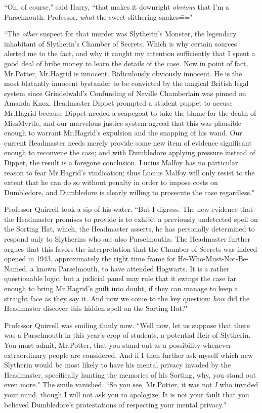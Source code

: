 ``Oh, of course," said Harry, ``that makes it downright \emph{obvious} that I'm a Parselmouth. Professor, \emph{what} the sweet slithering snakes\==="

``The \emph{other} suspect for that murder was Slytherin's Monster, the legendary inhabitant of Slytherin's Chamber of Secrets. Which is why certain sources alerted me to the fact, and why it caught my attention sufficiently that I spent a good deal of bribe money to learn the details of the case. Now in point of fact, Mr.\?Potter, Mr.\?Hagrid is innocent. Ridiculously obviously innocent. He is the most blatantly innocent bystander to be convicted by the magical British legal system since Grindelwald's Confunding of Neville Chamberlain was pinned on Amanda Knox. Headmaster Dippet prompted a student puppet to accuse Mr.\?Hagrid because Dippet needed a scapegoat to take the blame for the death of Miss\?Myrtle, and our marvelous justice system agreed that this was plausible enough to warrant Mr.\?Hagrid's expulsion and the snapping of his wand. Our current Headmaster needs merely provide some new item of evidence significant enough to reconvene the case; and with Dumbledore applying pressure instead of Dippet, the result is a foregone conclusion. Lucius Malfoy has no particular reason to fear Mr.\?Hagrid's vindication; thus Lucius Malfoy will only resist to the extent that he can do so without penalty in order to impose costs on Dumbledore, and Dumbledore is clearly willing to prosecute the case regardless."

Professor Quirrell took a sip of his water. ``But I digress. The new evidence that the Headmaster promises to provide is to exhibit a previously undetected spell on the Sorting Hat, which, the Headmaster asserts, he has personally determined to respond only to Slytherins who are also Parselmouths. The Headmaster further argues that this favors the interpretation that the Chamber of Secrets was indeed opened in 1943, approximately the right time frame for He-Who-Must-Not-Be-Named, a known Parselmouth, to have attended Hogwarts. It is a rather questionable logic, but a judicial panel may rule that it swings the case far enough to bring Mr.\?Hagrid's guilt into doubt, if they can manage to keep a straight face as they say it. And now we come to the key question: \emph{how} did the Headmaster discover this hidden spell on the Sorting Hat?"

Professor Quirrell was smiling thinly now. ``Well now, let us suppose that there was a Parselmouth in this year's crop of students, a potential Heir of Slytherin. You must admit, Mr.\?Potter, that you stand out as a possibility whenever extraordinary people are considered. And if I then further ask myself which new Slytherin would be most likely to have his mental privacy invaded by the Headmaster, specifically hunting the memories of his Sorting, why, you stand out even more." The smile vanished. ``So you see, Mr.\?Potter, it was not \emph{I} who invaded your mind, though I will not ask you to apologize. It is not your fault that you believed Dumbledore's protestations of respecting your mental privacy."

